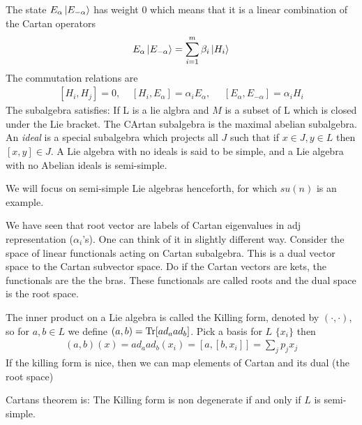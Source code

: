 \documentclass[a4paper,12pt]{article}
\begin{document}
The state $E_\alpha\ket{E_{-\alpha}}$ has weight 0 which means that it is a linear combination of the Cartan operators
\begin{equation}
	\begin{aligned}
		E_\alpha\ket{E_{-\alpha}}=\sum_{i=1}^{m}\beta _i\ket{H_i}
	\end{aligned}
\end{equation}
The commutation relations are 
\begin{equation}
	\begin{aligned}
		[H_i,H_j]=0,~~~~~[H_i,E_\alpha]=\alpha_i E_\alpha,~~~~~~ [E_\alpha,E_{-\alpha}]=\alpha_i H_i
	\end{aligned}
\end{equation}
The subalgebra satisfies: If L is a lie algbra and $M$ is a subset of L which is closed under the Lie bracket. The CArtan subalgebra is the maximal abelian subalgebra. An \textit{ideal} is a special subalgebra which projects all $J$
 such that if $x\in J, y\in L$ then $[x,y]\in J$. A Lie algebra with no ideals is said to be simple, and a Lie algebra with no Abelian ideals is semi-simple.

We will focus on semi-simple Lie algebras henceforth, for which $su(n)$ is an example.

We have seen that root vector are labels of Cartan eigenvalues in adj representation ($\alpha_i$'s). One can think of it in slightly different way. Consider the space of linear functionals acting on Cartan subalgebra. This is a dual vector space to the Cartan subvector space. Do if the Cartan vectors are kets, the functionals are the the bras. These functionals are called roots and the dual space is the root space.

The inner product on a Lie algebra is called the Killing form, denoted by $(\cdot,\cdot)$, so for $a,b\in L$ we define $(a,b)=\Tr[ad_a ad_b]$. Pick a basis for $L$ $\{x_i\}$ then 
\begin{equation}
	\begin{aligned}
		(a,b)(x)=ad_a ad_b(x_i)=[a,[b,x_i]]=\sum_j p_j x_j
	\end{aligned}
\end{equation}
If the killing form is nice, then we can map elements of Cartan and its dual (the root space)

Cartans theorem is: The Killing form is non degenerate if and only if $L$ is semi-simple.
\end{document}
